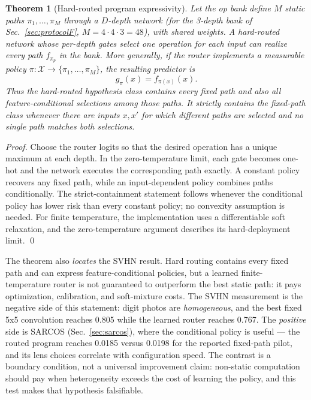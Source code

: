 \documentclass[11pt,a4paper]{article}
\newtheorem{theorem}{Theorem}
\begin{document}
\begin{theorem}[Hard-routed program expressivity]
\label{thm:program-hull}
Let the op bank define $M$ static paths $\pi_1,\dots,\pi_M$ through a
$D$-depth network (for the 3-depth bank of Sec.~\ref{sec:protocolF},
$M=4\cdot4\cdot3=48$), with shared weights. A hard-routed network whose
per-depth gates select one operation for each input can realize every path
$f_{\pi_p}$ in the bank. More generally, if the router implements a measurable
policy $\pi:\mathcal{X}\to\{\pi_1,\dots,\pi_M\}$, the resulting predictor is
\[
  g_\pi(x)=f_{\pi(x)}(x).
\]
Thus the hard-routed hypothesis class contains every fixed path and also all
feature-conditional selections among those paths. It strictly contains the
fixed-path class whenever there are inputs $x,x'$ for which different paths
are selected and no single path matches both selections.
\end{theorem}

\begin{proof}
Choose the router logits so that the desired operation has a unique maximum at
each depth. In the zero-temperature limit, each gate becomes one-hot and the
network executes the corresponding path exactly. A constant policy recovers any
fixed path, while an input-dependent policy combines paths conditionally. The
strict-containment statement follows whenever the conditional policy has lower
risk than every constant policy; no convexity assumption is needed. For finite
temperature, the implementation uses a differentiable soft relaxation, and the
zero-temperature argument describes its hard-deployment limit. \qed
\end{proof}

The theorem also \emph{locates} the SVHN result. Hard routing contains every
fixed path and can express feature-conditional policies, but a learned finite-
temperature router is not guaranteed to outperform the best static path: it
pays optimization, calibration, and soft-mixture costs. The SVHN measurement
is the negative side of this statement: digit photos are \emph{homogeneous},
and the best fixed 5x5 convolution reaches 0.805 while the learned router
reaches 0.767. The \emph{positive} side is SARCOS (Sec.~\ref{sec:sarcos}), where
the conditional policy is useful --- the routed program reaches 0.0185 versus
0.0198 for the reported fixed-path pilot, and its lens choices correlate with
configuration speed. The contrast is a boundary condition, not a universal
improvement claim: non-static computation should pay when heterogeneity exceeds
the cost of learning the policy, and this test makes that hypothesis falsifiable.
\end{document}
